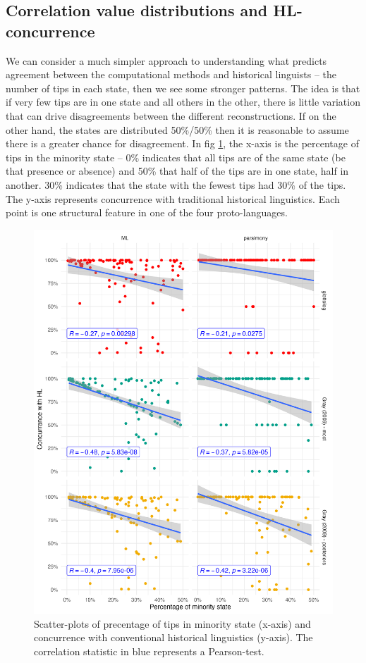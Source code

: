 \documentclass[12pt,letterpaper]{article}
\begin{document}
\subsection{Correlation value distributions and HL-concurrence}
\label{supp:cor_min_p_HL}
We can consider a much simpler approach to understanding what predicts agreement between the computational methods and historical linguists -- the number of tips in each state, then we see some stronger patterns. The idea is that if very few tips are in one state and all others in the other, there is little variation that can drive disagreements between the different reconstructions. If on the other hand, the states are distributed 50\%/50\% then it is reasonable to assume there is a greater chance for disagreement. In fig  \ref{fig:min_p_vs_concurrence}, the x-axis is the percentage of tips in the minority state -- 0\% indicates that all tips are of the same state (be that presence or absence) and 50\% that half of the tips are in one state, half in another. 30\% indicates that the state with the fewest tips had 30\% of the tips. The y-axis represents concurrence with traditional historical linguistics. Each point is one structural feature in one of the four proto-languages.

\begin{figure}[ht]
\centering
\includegraphics[width=12cm]{illustrations/plots_from_R/min_p_vs_HL_concurrance.png}
\caption{Scatter-plots of precentage of tips in minority state (x-axis) and concurrence with conventional historical linguistics (y-axis). The correlation statistic in blue represents a Pearson-test.}
\label{fig:min_p_vs_concurrence}
\end{figure}
\end{document}
